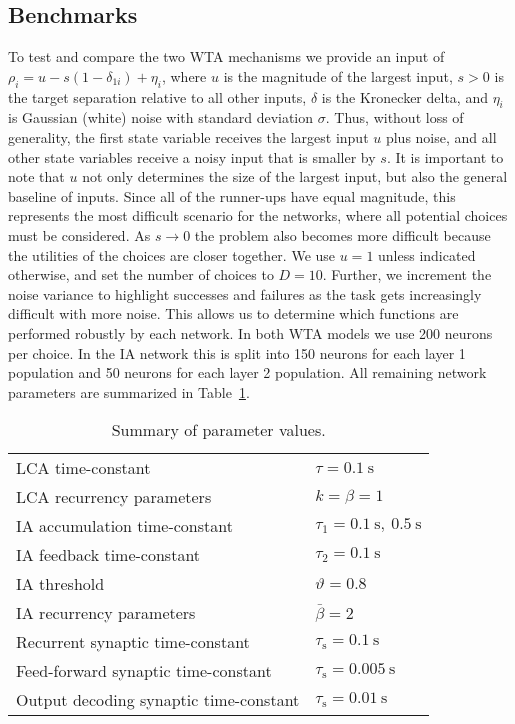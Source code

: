 \documentclass[10pt,letterpaper]{article}
\begin{document}
\subsection{Benchmarks}
To test and compare the two WTA mechanisms we provide an input of $\rho_i = u - s(1 - \delta_{1i}) + \eta_i$, where $u$ is the magnitude of the largest input, $s > 0$ is the target separation relative to all other inputs, $\delta$ is the Kronecker delta, and $\eta_i$ is Gaussian (white) noise with standard deviation $\sigma$.
Thus, without loss of generality, the first state variable receives the largest input $u$ plus noise, and all other state variables receive a noisy input that is smaller by $s$.
It is important to note that $u$ not only determines the size of the largest input, but also the general baseline of inputs.
Since all of the runner-ups have equal magnitude, this represents the most difficult scenario for the networks, where all potential choices must be considered.
As $s \rightarrow 0$ the problem also becomes more difficult because the utilities of the choices are closer together.
We use $u = 1$ unless indicated otherwise, and set the number of choices to $D = 10$.
Further, we increment the noise variance to highlight successes and failures as the task gets increasingly difficult with more noise.
This allows us to determine which functions are performed robustly by each network.
In both WTA models we use 200 neurons per choice.
In the IA network this is split into 150 neurons for each layer 1 population and 50 neurons for each layer 2 population.
All remaining network parameters are summarized in Table~\ref{tbl:params}.
\begin{table}
    \caption{Summary of parameter values.}\label{tbl:params}
    \begin{tabular}{ll}
        LCA time-constant & $\tau = \SI{0.1}{\second}$ \\
        LCA recurrency parameters & $k = \beta = 1$ \\
        IA accumulation time-constant & $\tau_1 = \SI{0.1}{\second},\ \SI{0.5}{\second}$ \\
        IA feedback time-constant & $\tau_2 = \SI{0.1}{\second}$ \\
        IA threshold & $\vartheta = 0.8$ \\
        IA recurrency parameters & $\bar{\beta} = 2$ \\
        Recurrent synaptic time-constant & $\tau_{\mathrm{s}} 
        = \SI{0.1}{\second}$ \\
        Feed-forward synaptic time-constant & $\tau_{\mathrm{s}} 
        = \SI{0.005}{\second}$ \\
        Output decoding synaptic time-constant & $\tau_{\mathrm{s}} 
        = \SI{0.01}{\second}$
    \end{tabular}
\end{table}
\end{document}
